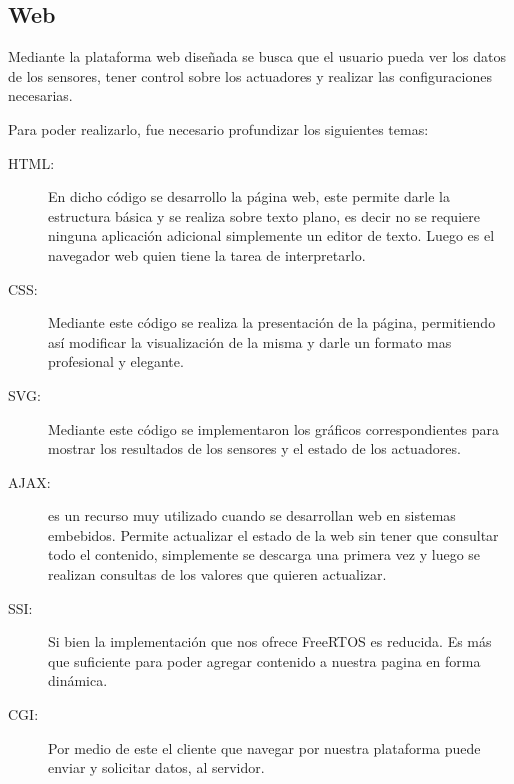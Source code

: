 \subsection{Web}
Mediante la plataforma web diseñada se busca que el usuario pueda ver los datos de los sensores, tener control sobre los actuadores y realizar las configuraciones necesarias. 

Para poder realizarlo, fue necesario profundizar los siguientes temas:
\begin{description}
  \item[HTML:] En dicho código se desarrollo la página web, este permite darle la estructura básica y se realiza sobre texto plano, es decir no se requiere ninguna aplicación adicional simplemente un editor de texto. Luego es el navegador web quien tiene la tarea de interpretarlo. 
  \item[CSS:] Mediante este código se realiza la presentación de la página, permitiendo así modificar la visualización de la misma y darle un formato mas profesional y elegante.
  \item[SVG:] Mediante este código se implementaron los gráficos correspondientes para mostrar los resultados de los sensores y el estado de los actuadores.
  \item[AJAX:] es un recurso muy utilizado cuando se desarrollan web en sistemas embebidos. Permite actualizar el estado de la web sin tener que consultar todo el contenido, simplemente se descarga una primera vez y luego se realizan consultas de los valores que quieren actualizar. 
  \item[SSI:] Si bien la implementación que nos ofrece FreeRTOS es reducida. Es más que suficiente para poder agregar contenido a nuestra pagina en forma dinámica.
  \item[CGI:] Por medio de este el cliente que navegar por nuestra plataforma puede enviar y solicitar datos, al servidor.
\end{description}

